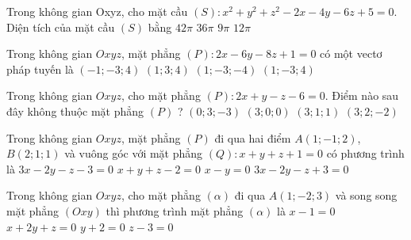 \begin{ex}%
Trong không gian Oxyz, cho mặt cầu $(S): x^{2}+y^{2}+z^{2}-2 x-4 y-6 z+5=0$. Diện tích của mặt cầu $(S)$ bằng
\choice
{$42 \pi$}
{\True $36 \pi$}
{$9 \pi$}
{$12 \pi$}
\end{ex}

\begin{ex}%
Trong không gian $O x y z$, mặt phẳng $(P): 2 x-6 y-8 z+1=0$ có một vectơ pháp tuyến là
\choice
{$(-1 ;-3 ; 4)$}
{$(1 ; 3 ; 4)$}
{\True $(1 ;-3 ;-4)$}
{$(1 ;-3 ; 4)$}
\end{ex}

\begin{ex}%
Trong không gian $Oxyz$, cho mặt phẳng $(P)\colon 2 x+y-z-6=0$. Điểm nào sau đây không thuộc mặt phẳng $(P)$ ?
\choice
{$(0 ; 3 ;-3)$}
{$(3 ; 0 ; 0)$}
{$(3 ; 1 ; 1)$}
{\True $(3 ; 2 ;-2)$}
\end{ex}

\begin{ex}%
Trong không gian $Oxyz$, mặt phẳng $(P)$ đi qua hai điểm $A(1;-1;2)$, $B(2;1;1)$ và vuông góc với mặt phẳng $(Q)\colon x+y+z+1=0$ có phương trình là
\choice
{\True $3x-2y-z-3=0$}
{$x+y+z-2=0$}
{$x-y=0$}
{$3x-2y-z+3=0$}
\end{ex}

\begin{ex}%
Trong không gian $Oxyz$, cho mặt phẳng $(\alpha)$ đi qua $A(1;-2;3)$ và song song mặt phẳng $(Oxy)$ thì phương trình mặt phẳng $(\alpha)$ là
\choice
{$x-1=0$}
{$x+2y+z=0$}
{$y+2=0$}
{\True $z-3=0$}
\end{ex}

